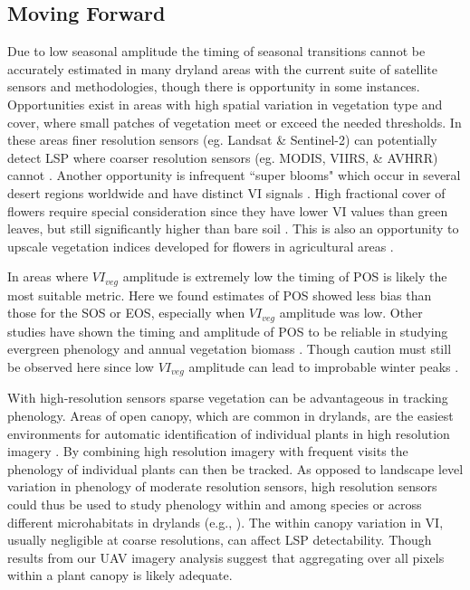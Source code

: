 \documentclass{article}
\begin{document}
\subsection{Moving Forward}
Due to low seasonal amplitude the timing of seasonal transitions cannot be accurately estimated in many dryland areas with the current suite of satellite sensors and methodologies, though there is opportunity in some instances. Opportunities exist in areas with high spatial variation in vegetation type and cover, where small patches of vegetation meet or exceed the needed thresholds. In these areas finer resolution sensors (eg. Landsat \& Sentinel-2) can potentially detect LSP where coarser resolution sensors (eg. MODIS, VIIRS, \& AVHRR) cannot \cite{peng2021}. Another opportunity is infrequent “super blooms" which occur in several desert regions worldwide and have distinct VI signals \cite{chavez2019}. High fractional cover of flowers require special consideration since they have lower VI values than green leaves, but still significantly higher than bare soil \cite{shen-chen2009}. This is also an opportunity to upscale vegetation indices developed for flowers in agricultural areas \cite{dixon2021, chen-jin2019}.

In areas where $VI_{veg}$ amplitude is extremely low the timing of POS is likely the most suitable metric. Here we found estimates of POS showed less bias than those for the SOS or EOS, especially when $VI_{veg}$ amplitude was low. Other studies have shown the timing and amplitude of POS to be reliable in studying evergreen phenology \cite{walker2014, walker2015} and annual vegetation biomass \cite{casady2013}. Though caution must still be observed here since low $VI_{veg}$ amplitude can lead to improbable winter peaks \cite{norris2020}.

With high-resolution sensors sparse vegetation can be advantageous in tracking phenology. Areas of open canopy, which are common in drylands, are the easiest environments for automatic identification of individual plants in high resolution imagery \cite{weinstein2020}. By combining high resolution imagery with frequent visits the phenology of individual plants can then be tracked. As opposed to landscape level variation in phenology of moderate resolution sensors, high resolution sensors could thus be used to study phenology within and among species or across different microhabitats in drylands (e.g., \cite{browning2017b}). The within canopy variation in VI, usually negligible at coarse resolutions, can affect LSP detectability. Though results from our UAV imagery analysis suggest that aggregating over all pixels within a plant canopy is likely adequate. 
\end{document}
